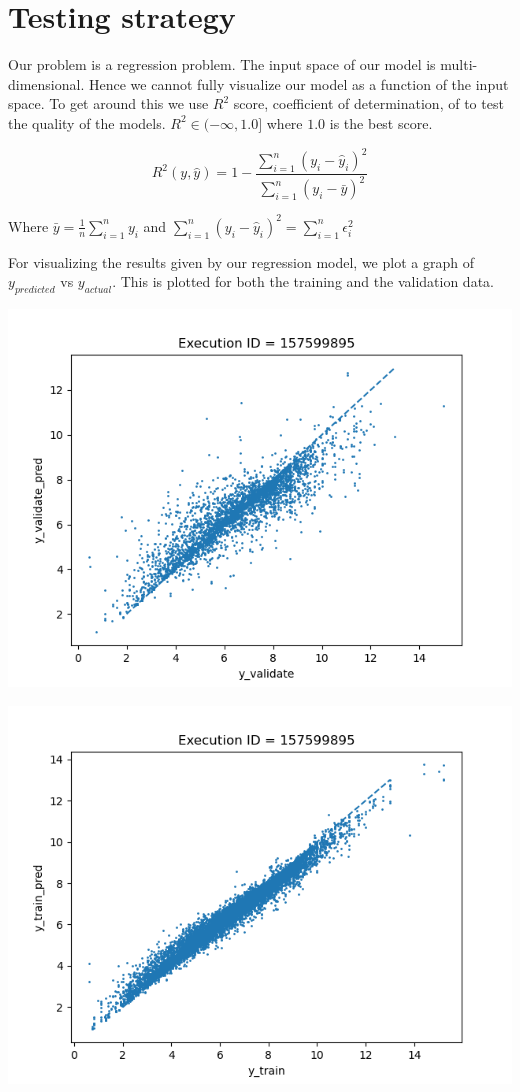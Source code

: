 \documentclass[11pt]{article}
\begin{document}
\section{Testing strategy}
Our problem is a regression problem.
The input space of our model is multi-dimensional.
Hence we cannot fully visualize our model as a function of the input space.
To get around this we use $R^2$ score,  coefficient of determination, of to test the quality of the models.
$ R^2  \in (- \infty, 1.0]$ where $1.0$ is the best score.
\cite{r_squared_score}

$$R^2(y, \hat{y}) = 1 - \frac{\sum_{i=1}^{n} (y_i - \hat{y}_i)^2}{\sum_{i=1}^{n} (y_i - \bar{y})^2}$$

Where
$\bar{y} = \frac{1}{n} \sum_{i=1}^{n} y_i$ 
and 
$\sum_{i=1}^{n} (y_i - \hat{y}_i)^2 = \sum_{i=1}^{n} \epsilon_i^2$

For visualizing the results given by our regression model,
we plot a graph of $y_{predicted}$ vs $y_{actual}$.
This is plotted for both the training and the validation data.

\includegraphics[scale=0.7]{accuracy_validate}

\includegraphics[scale=0.7]{accuracy_train}
\end{document}
